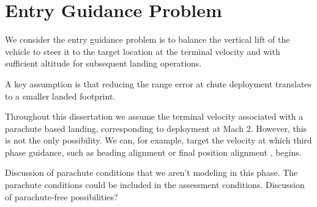 \chapter{Entry Guidance Problem}
We consider the entry guidance problem is to balance the vertical lift of the vehicle to steer it to the target location at the terminal velocity and with sufficient altitude for subsequent landing operations. 

A key assumption is that reducing the range error at chute deployment translates to a smaller landed footprint. 

Throughout this dissertation we assume the terminal velocity associated with a parachute based landing, corresponding to deployment at Mach 2. However, this is not the only possibility. We can, for example, target the velocity at which third phase guidance, such as heading alignment \cite{MSL_EDL2} or final position alignment \cite{GuangfeiDissertation}, begins. 

Discussion of parachute conditions that we aren't modeling in this phase. The parachute conditions could be included in the assessment conditions. Discussion of parachute-free possibilities? 




